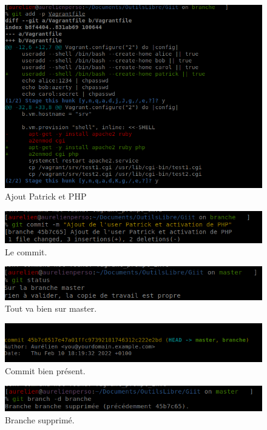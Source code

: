 \documentclass{article}
\begin{document}
\subsection{}

\begin{figure}[h]
\centering
\includegraphics[width=0.7\columnwidth]{screen/git2_1.png}
\caption{\label{fig:frog}Ajout Patrick et PHP}
\end{figure}

\begin{figure}[h]
\centering
\includegraphics[width=1\columnwidth]{screen/git2_2.png}
\caption{\label{fig:frog}Le commit.}
\end{figure}

\begin{figure}[h]
\centering
\includegraphics[width=0.7\columnwidth]{screen/git2_3.png}
\caption{\label{fig:frog}Tout va bien sur master.}
\end{figure}

\begin{figure}[h]
\centering
\includegraphics[width=0.7\columnwidth]{screen/git2_4.png}
\caption{\label{fig:frog}Commit bien présent.}
\end{figure}

\begin{figure}[h]
\centering
\includegraphics[width=0.7\columnwidth]{screen/git2_5.png}
\caption{\label{fig:frog}Branche supprimé.}
\end{figure}
\end{document}
